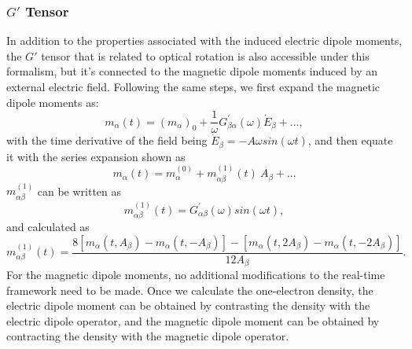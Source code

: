 \subsubsection{$G'$ Tensor} \label{theory-cc3-23}
In addition to the properties associated with the induced electric dipole moments, the $G'$ tensor that is related to optical rotation is also accessible under this formalism, but it's connected to the magnetic dipole moments induced by an external electric field. Following the same steps, we first expand the magnetic dipole moments as:
\begin{equation}
m_{\alpha} (t)= (m_{\alpha} )_{0} +\frac{1}{\omega} G^{'}_{\beta\alpha}(\omega)\dot E_{\beta} + ...,
\end{equation}
with the time derivative of the field being $\dot E_{\beta} = -A\omega sin(\omega t)$, and then equate it with the series expansion shown as
\begin{equation}
m_{\alpha}(t)= m_{\alpha}^{(0)} + m_{\alpha \beta}^{(1)}(t)\ A_{\beta} + ...
\end{equation}
$m_{\alpha\beta}^{(1)}$ can be written as
\begin{equation}
m_{\alpha \beta}^{(1)}(t)= G^{'}_{\alpha \beta}(\omega)sin(\omega t),
\end{equation}
and calculated as
\begin{equation}
m_{\alpha \beta}^{(1)}(t)=\frac{8[m_{\alpha}(t,A_{\beta})-m_{\alpha}(t,-A_{\beta})]-[m_{\alpha}(t,2A_{\beta})-m_{\alpha}(t,-2A_{\beta})]}{12A_{\beta}}.
\end{equation}
For the magnetic dipole moments, no additional modifications to the real-time framework need to be made. Once we calculate the one-electron density, the electric dipole moment can be obtained by contrasting the density with the electric dipole operator, and the magnetic dipole moment can be obtained by contracting the density with the magnetic dipole operator.

